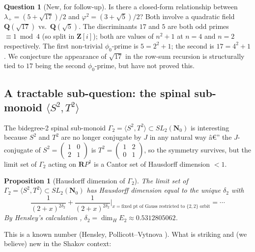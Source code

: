 ﻿\documentclass[11pt]{article}
\newtheorem{proposition}[theorem]{Proposition}
\theoremstyle{definition}
\newtheorem{question}[theorem]{Question}
\newcommand{\Nz}{\mathbf{N}_0}
\newcommand{\Z}{\mathbf{Z}}
\newcommand{\Q}{\mathbf{Q}}
\newcommand{\SLNz}{SL_2(\Nz)}
\begin{document}
\begin{question}[New, for follow-up]\label{q:lambda-varphi}
Is there a closed-form relationship between $\lambda_+=(5+\sqrt{17})/2$ and $\varphi^2=(3+\sqrt{5})/2$? Both involve a quadratic field $\Q(\sqrt{17})$ vs.\ $\Q(\sqrt{5})$. The discriminants $17$ and $5$ are both odd primes $\equiv 1\bmod 4$ (so split in $\Z[i]$); both are values of $n^2+1$ at $n=4$ and $n=2$ respectively. The first non-trivial $\phi_0$-prime is $5=2^2+1$; the second is $17=4^2+1$. We conjecture the appearance of $\sqrt{17}$ in the row-sum recursion is structurally tied to $17$ being the second $\phi_0$-prime, but have not proved this.
\end{question}

\subsection{A tractable sub-question: the spinal sub-monoid $\langle S^2,T^2\rangle$}

The bidegree-2 spinal sub-monoid $\Gamma_2=\langle S^2,T^2\rangle\subset\SLNz$ is interesting because $S^2$ and $T^2$ are no longer conjugate by $J$ in any natural way â€” the $J$-conjugate of $S^2=\begin{pmatrix}1&0\\2&1\end{pmatrix}$ is $T^2=\begin{pmatrix}1&2\\0&1\end{pmatrix}$, so the symmetry survives, but the limit set of $\Gamma_2$ acting on $\mathbf{R}P^1$ is a Cantor set of Hausdorff dimension $<1$.

\begin{proposition}[Hausdorff dimension of $\Gamma_2$]\label{prop:gamma-2-dim}
The limit set of $\Gamma_2=\langle S^2,T^2\rangle\subset\SLNz$ has Hausdorff dimension equal to the unique $\delta_2$ with
\[
\frac{1}{(2+x)^{2\delta_2}}+\frac{1}{(2+x)^{2\delta_2}}\bigg|_{x=\text{fixed pt of Gauss restricted to }\{2,2\}\text{ orbit}} = \cdots
\]
By Hensley's calculation \cite{hensley1992}, $\delta_2=\dim_H E_2\approx 0.5312805062$.
\end{proposition}

This is a known number (Hensley, Pollicott--Vytnova \cite{pollicott-vytnova}). What is striking and (we believe) new in the Shakov context:
\end{document}
